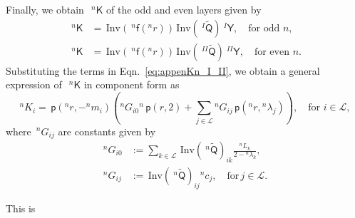 \documentclass[preprint,10pt,times]{elsarticle}
\numberwithin{equation}{section}
\renewcommand{\u}[1]{\boldsymbol{#1}}
\newcommand{\usf}[1]{\u{\mathsf #1}}
\newcommand{\pr}[1]{\left( #1 \right)}
\newcommand{\p}{\,\mathsf{p}}
\newcommand{\Inv}{\,\mathrm{Inv}}
\renewcommand{\>}{$\Rightarrow$}
\begin{document}
Finally, we obtain~$~^{n}{\usf{K}}$ of the odd and even layers given by
\begin{subequations}
\begin{align}
	~^{n}{\usf{K}} & = \Inv\pr{~^{n}\usf{f}({}^{n}\!r)} \Inv\pr{~^{I}\tilde{\usf{Q}}}~^{I}\usf{Y}, \quad \text{for odd~$n$}, \\
	~^{n}{\usf{K}} & = \Inv\pr{~^{n}\usf{f}({}^{n}\!r)} \Inv\pr{~^{II}\tilde{\usf{Q}}}~^{II}\usf{Y}, \quad \text{for even~$n$}.
\end{align}
\label{eq:appenKn_I_II}
\end{subequations}
Substituting the terms in Eqn.~\eqref{eq:appenKn_I_II}, we obtain a general expression of~$~^{n}{\usf{K}}$ in component form as
\begin{equation}
{}^{n}\!{K_{i}} = \p\pr{{}^{n}\!{r},-{}^{n}\!{m_{i}}} \left( {}^{n}\!G_{i0} {}^{n} \p\pr{r,2} + \sum_{j \in \mathcal{L}} {}^{n}\!G_{ij} \p\pr{{}^{n}r,{}^{n}\!{\lambda_{j}}} \right) , \quad \text{for~$i \in \mathcal{L}$},
\label{eq:appenKn}
\end{equation}
where~${}^{n}\!G_{ij}$ are constants given by
\begin{subequations}
\begin{align}
	{}^{n}\!G_{i0}& := \sum_{k \in \mathcal{L}} \Inv\pr{~^{n}\tilde{\usf{Q}}}_{ik} \frac{{}^{n}\!L_{k}}{2 - {}^{n}\!\lambda_{k}}, \\
	{}^{n}\!G_{ij}& := \Inv\pr{~^{n}\tilde{\usf{Q}}}_{ij} {}^{n}\!c_{j}, \quad \text{for}\, j\in \mathcal{L} .
\end{align}
\label{eq:Gjin}
\end{subequations}

\newpage



This is
\end{document}
